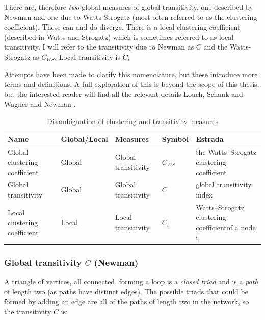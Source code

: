 There are, therefore \textit{two} global measures of global transitivity, one described by Newman and one due to Watts-Strogatz (most often referred to as the clustering coefficient). These can and do diverge. There is a local clustering coefficient (described in Watts and Strogatz\cite{watts1998collective}) which is sometimes referred to as local transitivity. I will refer to the transitivity due to Newman as $C$ and the Watts-Strogatz as $C_{WS}$. Local transitivity is $C_i$

Attempts have been made to clarify this nomenclature\cite{estrada2016local}, but these introduce more terms and definitions. A full exploration of this is beyond the scope of this thesis, but the interested reader will find all the relevant details Louch\cite{louch2000personal},  Schank and Wagner\cite{schank2005approximating} and  Newman \cite{newman2018networks}. 
 


\begin{table}[]
    \centering
    \begin{adjustbox}{width=\textwidth}
   
    \begin{tabular}{lllll}
    \toprule
       Name  & Global/Local & Measures & Symbol & Estrada\cite{estrada2016local} \\
 \midrule
        Global clustering coefficient & Global & Global transitivity & $C_{WS}$ & {the Watts–Strogatz clustering coefficient}  \\
        
        Global transitivity & Global & Global transitivity & $C$ & global transitivity index  \\
        Local clustering coefficient & Local & Local transitivity & $C_i$ & Watts–Strogatz clustering coefficientof a node i,\\
        \bottomrule
    \end{tabular}
     \end{adjustbox}
    \caption{Disambiguation of clustering and transitivity measures}
    \label{tab:disambiguation transitivity}
\end{table}


\subsubsection{Global transitivity $C$ (Newman)}
\label{sec:global transitivity newman}
A triangle of vertices,  all connected, forming a loop is a \textit{closed triad}  and is a \textit{path} of length two (as paths have distinct edges)\cite{newman2018networks}. The possible triads that could be formed by adding an edge are all of the paths of length two in the network, so the transitivity $C$ is:

